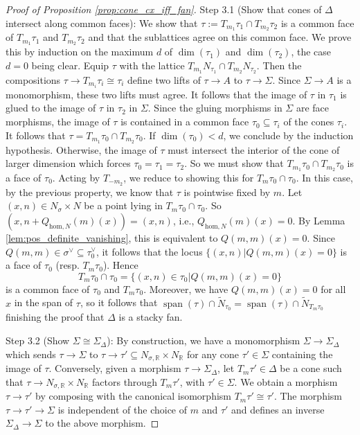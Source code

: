 \documentclass[10pt,a4paper]{amsart}
\DeclareMathOperator{\Span}{span}
\def\hom{\mathrm{hom}}
\begin{document}
\begin{proof}[Proof of Proposition \ref{prop:cone_cx_iff_fan}]
	Step 3.1 (Show that cones of $\Delta$ intersect along common faces): We show that $\tau:=T_{m_1}\tau_1\cap T_{m_2}\tau_2$ is a common face of $T_{m_1}\tau_1$
	and $T_{m_2}\tau_2$ and that the sublattices agree on this common face. We prove this by induction on the maximum $d$ of $\dim(\tau_1)$
	and $\dim(\tau_2)$, the case $d=0$ being clear. Equip $\tau$ with the lattice $T_{m_1}N_{\tau_1}\cap T_{m_2}N_{\tau_2}$.
	Then the compositions $\tau\to T_{m_{i}}\tau_{i}\cong \tau_i$ define two lifts of $\tau\to A$ to $\tau\to \Sigma$. Since $\Sigma\to A$
	is a monomorphism, these two lifts must agree. It follows that the image of $\tau$ in $\tau_1$ is glued to the image of $\tau$ in $\tau_2$
	in $\Sigma$. Since the gluing morphisms in $\Sigma$ are face morphisms, the image of $\tau$ is contained in a common face
	$\tau_0\subseteq \tau_i$ of the cones $\tau_i$. It follows that $\tau=T_{m_1}\tau_0\cap T_{m_2}\tau_0$. If $\dim(\tau_0)<d$, we conclude
	by the induction hypothesis. Otherwise, the image of $\tau$ must intersect the interior of the cone of larger dimension which forces
	$\tau_0=\tau_1=\tau_2$. So we must show that $T_{m_1}\tau_0\cap T_{m_2}\tau_0$ is a face of $\tau_0$. Acting by $T_{-m_2}$,
	we reduce to showing this for $T_{m}\tau_0\cap \tau_0$. In this case, by the previous property, we know that $\tau$ is pointwise
	fixed by $m$. Let $(x,n)\in N_{\sigma}\times N$ be a point lying in $T_m\tau_0\cap \tau_0$.
	So $(x,n+Q_{\hom,N}(m)(x))=(x,n)$, i.e., $Q_{\hom,N}(m)(x)=0$. By Lemma \ref{lem:pos_definite_vanishing}, this is equivalent
	to $Q(m,m)(x)=0$. Since $Q(m,m)\in \sigma^{\vee}\subseteq \tau_0^{\vee}$, it follows that the locus $\{(x,n)|Q(m,m)(x)=0\}$
	is a face of $\tau_0$ (resp. $T_{m}\tau_0$). Hence
	$$T_m\tau_0\cap \tau_0=\{(x,n)\in \tau_0|Q(m,m)(x)=0\}$$
	is a common face
	of $\tau_0$ and $T_m\tau_0$. Moreover, we have $Q(m,m)(x)=0$ for all $x$ in the span of $\tau$, so it follows that
	$\Span(\tau)\cap \tilde{N}_{\tau_0}=\Span(\tau)\cap \tilde{N}_{T_m \tau_0}$ finishing the proof that $\Delta$ is a stacky fan.

	Step 3.2 (Show $\Sigma\cong \Sigma_{\Delta}$): By construction, we have a monomorphism $\Sigma\to \Sigma_{\Delta}$
	which sends $\tau\to \Sigma$ to $\tau\to \tau'\subseteq N_{\sigma,\mathbb{R}}\times N_{\mathbb{R}}$ for any cone $\tau'\in \Sigma$ containing the
	image of $\tau$. Conversely, given a morphism $\tau\to \Sigma_{\Delta}$, let $T_m\tau'\in \Delta$ be a cone such
	that $\tau\to N_{\sigma,\mathbb{R}}\times N_{\mathbb{R}}$ factors through $T_m\tau'$, with $\tau'\in \Sigma$. We obtain a morphism $\tau\to \tau'$
	by composing with the canonical isomorphism $T_m\tau'\cong \tau'$. The morphism $\tau\to \tau'\to \Sigma$ is independent of the
	choice of $m$ and $\tau'$ and defines an inverse $\Sigma_{\Delta}\to \Sigma$ to the above morphism.
\end{proof}
\end{document}
